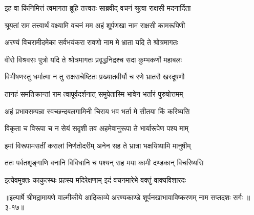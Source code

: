 \twolineshloka
{इह वा किंनिमित्तं त्वमागता ब्रूहि तत्त्वतः}
{साब्रवीद् वचनं श्रुत्वा राक्षसी मदनार्दिता} %

\twolineshloka
{श्रूयतां राम तत्त्वार्थं वक्ष्यामि वचनं मम}
{अहं शूर्पणखा नाम राक्षसी कामरूपिणी} %

\twolineshloka
{अरण्यं विचरामीदमेका सर्वभयंकरा}
{रावणो नाम मे भ्राता यदि ते श्रोत्रमागतः} %

\twolineshloka
{वीरो विश्रवसः पुत्रो यदि ते श्रोत्रमागतः}
{प्रवृद्धनिद्रश्च सदा कुम्भकर्णो महाबलः} %

\twolineshloka
{विभीषणस्तु धर्मात्मा न तु राक्षसचेष्टितः}
{प्रख्यातवीर्यौ च रणे भ्रातरौ खरदूषणौ} %

\twolineshloka
{तानहं समतिक्रान्तां राम त्वापूर्वदर्शनात्}
{समुपेतास्मि भावेन भर्तारं पुरुषोत्तमम्} %

\twolineshloka
{अहं प्रभावसम्पन्ना स्वच्छन्दबलगामिनी}
{चिराय भव भर्ता मे सीतया किं करिष्यसि} %

\twolineshloka
{विकृता च विरूपा च न सेयं सदृशी तव}
{अहमेवानुरूपा ते भार्यारूपेण पश्य माम्} %

\twolineshloka
{इमां विरूपामसतीं करालां निर्णतोदरीम्}
{अनेन सह ते भ्रात्रा भक्षयिष्यामि मानुषीम्} %

\twolineshloka
{ततः पर्वतशृङ्गाणि वनानि विविधानि च}
{पश्यन् सह मया कामी दण्डकान् विचरिष्यसि} %

\twolineshloka
{इत्येवमुक्तः काकुत्स्थः प्रहस्य मदिरेक्षणाम्}
{इदं वचनमारेभे वक्तुं वाक्यविशारदः} %


॥इत्यार्षे श्रीमद्रामायणे वाल्मीकीये आदिकाव्ये अरण्यकाण्डे शूर्पनखाभावाविष्करणम् नाम सप्तदशः सर्गः ॥३-१७॥
